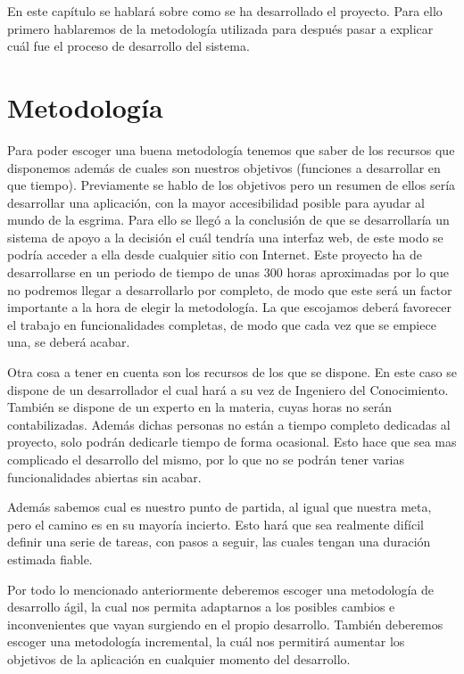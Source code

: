 En este capítulo se hablará sobre como se ha desarrollado el proyecto. Para ello primero hablaremos
de la metodología utilizada para después pasar a explicar cuál fue el proceso de desarrollo del sistema.

\section{Metodología}

Para poder escoger una buena metodología tenemos que saber de los recursos que disponemos además
de cuales son nuestros objetivos (funciones a desarrollar en que tiempo). Previamente se hablo
de los objetivos pero un resumen de ellos sería desarrollar una aplicación, con la mayor
accesibilidad posible para ayudar al mundo de la esgrima. Para ello se llegó a la conclusión de que
se desarrollaría un sistema de apoyo a la decisión el cuál tendría una interfaz web, de este modo
se podría acceder a ella desde cualquier sitio con Internet. Este proyecto ha de desarrollarse
en un periodo de tiempo de unas 300 horas aproximadas por lo que no podremos llegar a
desarrollarlo por completo, de modo que este será un factor importante a la hora de elegir la metodología.
La que escojamos deberá favorecer el trabajo en funcionalidades completas, de modo que cada vez
que se empiece una, se deberá acabar.

Otra cosa a tener en cuenta son los recursos de los que se dispone. En este caso se dispone de
un desarrollador el cual hará a su vez de Ingeniero del Conocimiento. También se dispone de un
experto en la materia, cuyas horas no serán contabilizadas. Además dichas personas no están a tiempo
completo dedicadas al proyecto, solo podrán dedicarle tiempo de forma ocasional. Esto hace que sea
mas complicado el desarrollo del mismo, por lo que no se podrán tener varias funcionalidades abiertas
sin acabar.

Además sabemos cual es nuestro punto de partida, al igual que nuestra meta, pero el camino es
en su mayoría incierto. Esto hará que sea realmente difícil definir una serie de tareas, con
pasos a seguir, las cuales tengan una duración estimada fiable.

Por todo lo mencionado anteriormente deberemos escoger una metodología de desarrollo ágil, la cual
nos permita adaptarnos a los posibles cambios e inconvenientes que vayan surgiendo en el propio
desarrollo. También deberemos escoger una metodología incremental, la cuál nos permitirá aumentar
los objetivos de la aplicación en cualquier momento del desarrollo.

